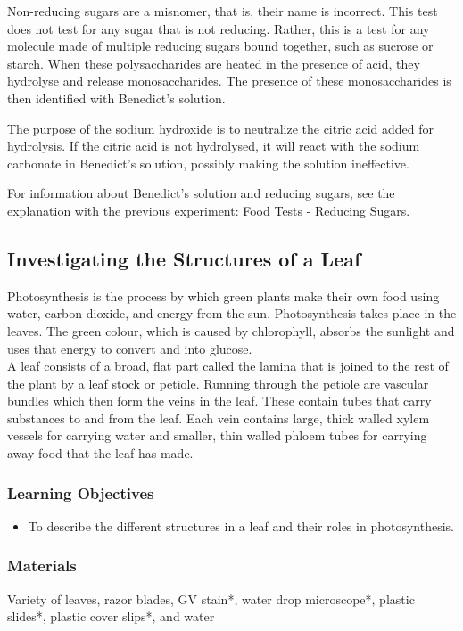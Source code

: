 Non-reducing sugars are a misnomer, that is, their name is incorrect. This test does not test for any sugar that is not reducing. Rather, this is a test for any molecule made of multiple reducing sugars bound together, such as sucrose or starch. When these polysaccharides are heated in the presence of acid, they hydrolyse and release monosaccharides. The presence of these monosaccharides is then identified with Benedict's solution.

The purpose of the sodium hydroxide is to neutralize the citric acid added for hydrolysis. If the citric acid is not hydrolysed, it will react with the sodium carbonate in Benedict's solution, possibly making the solution ineffective.

For information about Benedict's solution and reducing sugars, see the explanation with the previous experiment: Food Tests - Reducing Sugars.

\subsection{Investigating the Structures of a Leaf}
Photosynthesis is the process by which green plants make their own food using water, carbon dioxide, and energy from the sun. Photosynthesis takes place in the leaves. The green colour, which is caused by chlorophyll, absorbs the sunlight and uses that energy to convert  and  into glucose. \\A leaf consists of a broad, flat part called the lamina that is joined to the rest of the plant by a leaf stock or petiole. Running through the petiole are vascular bundles which then form the veins in the leaf. These contain tubes that carry substances to and from the leaf. Each vein contains large, thick walled xylem vessels for carrying water and smaller, thin walled phloem tubes for carrying away food that the leaf has made.

\subsubsection*{Learning Objectives}
\begin{itemize}
\item{To describe the different structures in a leaf and their roles in photosynthesis.}
\end{itemize}

\subsubsection*{Materials}
Variety of leaves, razor blades, GV stain*, water drop microscope*, plastic slides*, plastic cover slips*, and water

